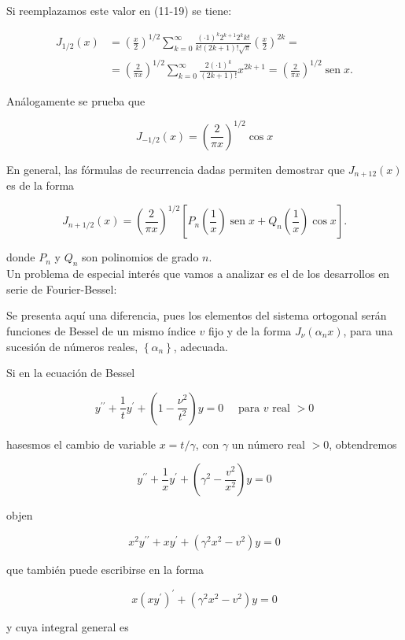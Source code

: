 \documentclass[10pt]{article}
\theoremstyle{plain}
\theoremstyle{definition}
\theoremstyle{remark}
\begin{document}
Si reemplazamos este valor en (11-19) se tiene:

$$
\begin{aligned}
J_{1 / 2}(x) & =\left(\frac{x}{2}\right)^{1 / 2} \sum_{k=0}^{\infty} \frac{(\cdot 1)^{k} 2^{k+1} 2^{k} k!}{k!(2 k+1)!\sqrt{\pi}}\left(\frac{x}{2}\right)^{2 k}= \\
& =\left(\frac{2}{\pi x}\right)^{1 / 2} \sum_{k=0}^{\infty} \frac{2(\cdot 1)^{k}}{(2 k+1)!} x^{2 k+1}=\left(\frac{2}{\pi x}\right)^{1 / 2} \operatorname{sen} x .
\end{aligned}
$$

Análogamente se prueba que

$$
J_{-1 / 2}(x)=\left(\frac{2}{\pi x}\right)^{1 / 2} \cos x
$$

En general, las fórmulas de recurrencia dadas permiten demostrar que $J_{n+12}(x)$ es de la forma

$$
J_{n+1 / 2}(x)=\left(\frac{2}{\pi x}\right)^{1 / 2}\left[P_{n}\left(\frac{1}{x}\right) \operatorname{sen} x+Q_{n}\left(\frac{1}{x}\right) \cos x\right] .
$$

donde $P_{n}$ y $Q_{n}$ son polinomios de grado $n$.\\
Un problema de especial interés que vamos a analizar es el de los desarrollos en serie de Fourier-Bessel:

Se presenta aquí una diferencia, pues los elementos del sistema ortogonal serán funciones de Bessel de un mismo índice $v$ fijo y de la forma $J_{\nu}\left(\alpha_{n} x\right)$, para una sucesión de números reales, $\left\{\alpha_{n}\right\}$, adecuada.

Si en la ecuación de Bessel

$$
y^{\prime \prime}+\frac{1}{t} y^{\prime}+\left(1-\frac{\nu^{2}}{t^{2}}\right) y=0 \quad \text { para } v \text { real }>0
$$

hasesmos el cambio de variable $x=t / \gamma$, con $\gamma$ un número real $>0$, obtendremos

$$
y^{\prime \prime}+\frac{1}{x} y^{\prime}+\left(\gamma^{2}-\frac{v^{2}}{x^{2}}\right) y=0
$$

objen

$$
x^{2} y^{\prime \prime}+x y^{\prime}+\left(\gamma^{2} x^{2}-v^{2}\right) y=0
$$

que también puede escribirse en la forma

$$
x\left(x y^{\prime}\right)^{\prime}+\left(\gamma^{2} x^{2}-v^{2}\right) y=0
$$

y cuya integral general es
\end{document}
